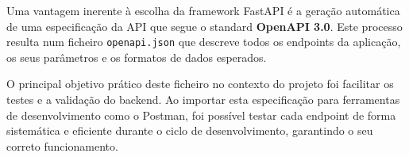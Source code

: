 Uma vantagem inerente à escolha da framework FastAPI é a geração automática de uma especificação da API que segue o standard \textbf{OpenAPI 3.0}. Este processo resulta num ficheiro \texttt{openapi.json} que descreve todos os endpoints da aplicação, os seus parâmetros e os formatos de dados esperados.

O principal objetivo prático deste ficheiro no contexto do projeto foi facilitar os testes e a validação do backend. Ao importar esta especificação para ferramentas de desenvolvimento como o Postman, foi possível testar cada endpoint de forma sistemática e eficiente durante o ciclo de desenvolvimento, garantindo o seu correto funcionamento.


